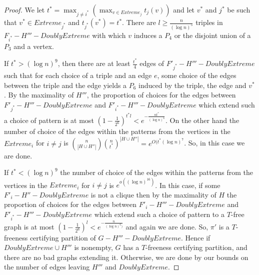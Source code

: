 \documentclass[12pt]{article}
\theoremstyle{definition}
\begin{document}
\begin{proof}
We let $t^*=\max_{j\neq {i^*}} (\max _{v \in Extreme_j } t_j(v))$ and let $v^*$ and $j^*$ be such that $v^* \in Extreme_{j^*}$ and $t_{j^*}(v^*)=t^*$.
There are   $l \ge \frac{n}{(\log n)^5}$ triples in $F_{i^*}-H'''-DoublyExtreme$ with which $v$ induces a $P_4$ or the disjoint union of a $P_3$ and a vertex.

If $t^* > (\log n)^9$,  then there are at least $\frac{t^*}{4}$ edges of $F'_{j^*}-H'''-DoublyExtreme$ such that for each choice of a triple  and an edge $e$,
some choice of the edges between the triple and the edge yields a $P_6$ induced by the triple, the edge and $v^*$. By the maximality of $H'''$,
the proportion of choices for the edges between   $F'_{j^*}-H'''-DoublyExtreme$ and $F'_{i^*}-H'''-DoublyExtreme$ which extend such a choice of pattern   is at most  $(1-\frac{1}{2^6})^{t^*l}<e^{-\frac{nt^*}{(\log n)^6}}$.
On the other hand the number of choice of the edges  within the patterns from the vertices in the $Extreme_i$ for $i \neq j$ 
is ${n \choose |H  \cup H''|}{n \choose t^*}^{|H \cup H''|}=e^{O(t^*(\log n)^7}$. So, in this case we are done. 

If $t^*<(\log n)^9$ the number of choice of the edges  within the patterns from the vertices in the $Extreme_i$ for $i \neq j$ 
is $e^{o((\log n)^{16})}$. In this case, if  some $F'_i-H''-DoublyExtreme$ is not a clique then by the maximality of $H$ the  proportion of choices for the edges between   $F'_i-H'''-DoublyExtreme$ and $F'_{i^*}-H'''-DoublyExtreme$ which extend such a choice of pattern to a $T$-free graph  is at most  $(1-\frac{1}{2^6})^{l}<e^{-\frac{n}{(\log n)^6)}}$ and again we are done. So,
$\pi'$ is a $T$-freeness certifying partition of $G-H'''-DoublyExtreme$. Hence if $DoublyExtreme \cup H'''$ is nonempty, $G$ has a $T$-freeness certifying partition,
and there are no bad graphs extending it. Otherwise, we are done by our bounds on the number of edges leaving $H'''$ and $DoublyExtreme$. 
\end{proof}
\end{document}
